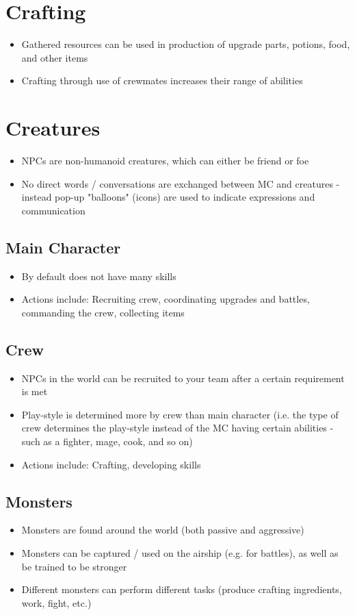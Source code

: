 \documentclass[a4paper]{scrreprt}
\begin{document}
\section{Crafting}
\begin{itemize}
\item Gathered resources can be used in production of upgrade parts, potions, food, and other items
\item Crafting through use of crewmates increases their range of abilities
\end{itemize}

\section{Creatures}
\begin{itemize}
\item NPCs are non-humanoid creatures, which can either be friend or foe
\item No direct words / conversations are exchanged between MC and creatures - instead pop-up "balloons" (icons) are used to indicate expressions and communication
\end{itemize}

\subsection{Main Character}
\begin{itemize}
\item By default does not have many skills
\item Actions include: Recruiting crew, coordinating upgrades and battles, commanding the crew, collecting items
\end{itemize}

\subsection{Crew}
\begin{itemize}
\item NPCs in the world can be recruited to your team after a certain requirement is met
\item Play-style is determined more by crew than main character (i.e. the type of crew determines the play-style instead of the MC having certain abilities - such as a fighter, mage, cook, and so on)
\item Actions include: Crafting, developing skills
\end{itemize}

\subsection{Monsters}
\begin{itemize}
\item Monsters are found around the world (both passive and aggressive)
\item Monsters can be captured / used on the airship (e.g. for battles), as well as be trained to be stronger
\item Different monsters can perform different tasks (produce crafting ingredients, work, fight, etc.)
\end{itemize}
\end{document}
